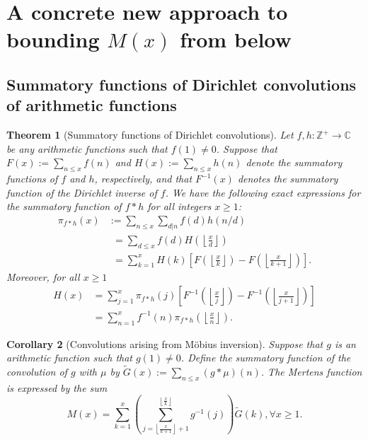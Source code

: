 \documentclass[11pt,reqno,a4letter]{article}
\numberwithin{figure}{section}
\numberwithin{table}{section}
\newcommand{\floor}[1]{\left\lfloor #1 \right\rfloor}
\newcommand{\Floor}[2]{\ensuremath{\left\lfloor \frac{#1}{#2} \right\rfloor}}
\theoremstyle{plain}
\newtheorem{theorem}{Theorem}
\newtheorem{cor}[theorem]{Corollary}
\numberwithin{theorem}{section}
\theoremstyle{definition}
\begin{document}
\newpage 
\section{A concrete new approach to bounding $M(x)$ from below} 

\subsection{Summatory functions of Dirichlet convolutions of arithmetic functions} 

\begin{theorem}[Summatory functions of Dirichlet convolutions] 
\label{theorem_SummatoryFuncsOfDirCvls} 
Let $f,h: \mathbb{Z}^{+} \rightarrow \mathbb{C}$ be any arithmetic functions such that $f(1) \neq 0$. 
Suppose that $F(x) := \sum_{n \leq x} f(n)$ and $H(x) := \sum_{n \leq x} h(n)$ denote the summatory 
functions of $f$ and $h$, respectively, and that $F^{-1}(x)$ denotes the summatory function of the 
Dirichlet inverse of $f$. We have the following exact expressions for the 
summatory function of $f \ast h$ for all integers $x \geq 1$: 
\begin{align*} 
\pi_{f \ast h}(x) & := \sum_{n \leq x} \sum_{d|n} f(d) h(n/d) \\ 
     & \phantom{:}= \sum_{d \leq x} f(d) H\left(\Floor{x}{d}\right) \\ 
     & \phantom{:}= \sum_{k=1}^{x} H(k) \left[F\left(\Floor{x}{k}\right) - 
     F\left(\Floor{x}{k+1}\right)\right]. 
\end{align*} 
Moreover, for all $x \geq 1$ 
\begin{align*} 
H(x) & = \sum_{j=1}^{x} \pi_{f \ast h}(j) \left[F^{-1}\left(\Floor{x}{j}\right) - 
     F^{-1}\left(\Floor{x}{j+1}\right)\right] \\ 
     & = \sum_{n=1}^{x} f^{-1}(n) \pi_{f \ast h}\left(\Floor{x}{n}\right). 
\end{align*} 
\end{theorem} 

\begin{cor}[Convolutions arising from M\"obius inversion] 
\label{cor_CvlGAstMu} 
Suppose that $g$ is an arithmetic function such that 
$g(1) \neq 0$. Define the summatory function of 
the convolution of $g$ with $\mu$ by $\widetilde{G}(x) := \sum_{n \leq x} (g \ast \mu)(n)$. 
The Mertens function is expressed by the sum 
\[
M(x) = \sum_{k=1}^{x} \left(\sum_{j=\floor{\frac{x}{k+1}}+1}^{\floor{\frac{x}{k}}} g^{-1}(j)\right) 
     \widetilde{G}(k), \forall x \geq 1. 
\]
\end{cor} 
\end{document}
